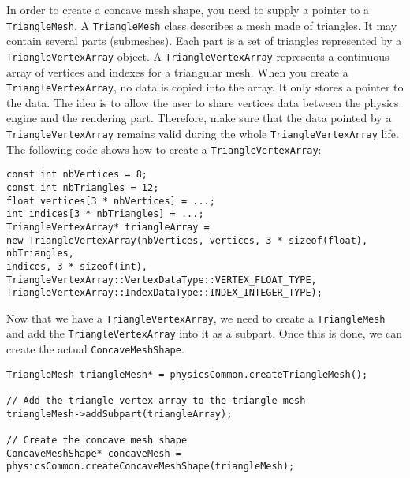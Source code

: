 \documentclass[a4paper,12pt]{article}
\begin{document}
  In order to create a concave mesh shape, you need to supply a pointer to a \texttt{TriangleMesh}. A \texttt{TriangleMesh} class
  describes a mesh made of triangles. It may contain several parts (submeshes). Each part is a set of
  triangles represented by a \texttt{TriangleVertexArray} object. A \texttt{TriangleVertexArray} represents
  a continuous array of vertices and indexes for a triangular mesh. When you create a \texttt{TriangleVertex\allowbreak Array}, no data is copied
  into the array. It only stores a pointer to the data. The idea is to allow the user to share vertices data between the physics engine and the rendering
  part. Therefore, make sure that the data pointed by a \texttt{TriangleVertexArray} remains valid during the whole \texttt{TriangleVertexArray} life.
  \\

  The following code shows how to create a \texttt{TriangleVertexArray}: \\

  \begin{lstlisting}
const int nbVertices = 8;
const int nbTriangles = 12;
float vertices[3 * nbVertices] = ...;
int indices[3 * nbTriangles] = ...;
TriangleVertexArray* triangleArray =
new TriangleVertexArray(nbVertices, vertices, 3 * sizeof(float), nbTriangles,
indices, 3 * sizeof(int),
TriangleVertexArray::VertexDataType::VERTEX_FLOAT_TYPE,
TriangleVertexArray::IndexDataType::INDEX_INTEGER_TYPE);
  \end{lstlisting}

  \vspace{0.6cm}

  Now that we have a \texttt{TriangleVertexArray}, we need to create a \texttt{TriangleMesh} and add the \texttt{TriangleVertexArray}
  into it as a subpart. Once this is done, we can create the actual \texttt{ConcaveMeshShape}. \\

  \begin{lstlisting}
TriangleMesh triangleMesh* = physicsCommon.createTriangleMesh();

// Add the triangle vertex array to the triangle mesh
triangleMesh->addSubpart(triangleArray);

// Create the concave mesh shape
ConcaveMeshShape* concaveMesh = physicsCommon.createConcaveMeshShape(triangleMesh);
  \end{lstlisting}

  \vspace{0.6cm}
\end{document}
